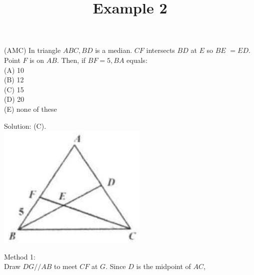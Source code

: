 \documentclass{article}
\title{Example 2}
\date{}
\begin{document}
\maketitle

(AMC) In triangle \(A B C, B D\) is a median. \(C F\) intersects \(B D\) at \(E\) so \(B E\) \(=E D\). Point \(F\) is on \(A B\). Then, if \(B F=5, B A\) equals:\\
(A) 10\\
(B) 12\\
(C) 15\\
(D) 20\\
(E) none of these

Solution: (C).\\
\centering
\includegraphics[width=\textwidth]{images/102(4).jpg}

Method 1:\\
Draw \(D G / / A B\) to meet \(C F\) at \(G\). Since \(D\) is the midpoint of \(A C\),
\end{document}
